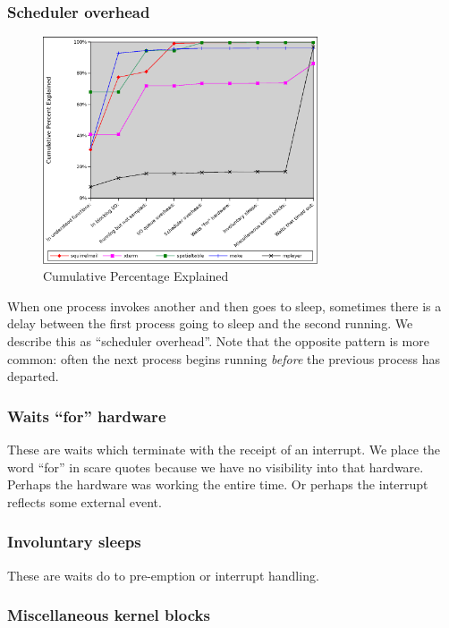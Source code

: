 \documentclass[10pt]{article}
\begin{document}
\subsubsection{Scheduler overhead}
\begin{figure}[b!]
\includegraphics[width=3.2in]{images/5cumugraph}
\caption{Cumulative Percentage Explained}
\label{fig:resgraph}
\end{figure}

When one process invokes another and then goes to sleep, sometimes there is a delay between the first process going to sleep and the second running.  We describe this as ``scheduler overhead''.  Note that the opposite pattern is more common: often the next process begins running \emph{before} the previous process has departed.

\subsubsection{Waits ``for'' hardware}

These are waits which terminate with the receipt of an interrupt.  We place the word ``for'' in scare quotes because we have no visibility into that hardware.  Perhaps the hardware was working the entire time.  Or perhaps the interrupt reflects some external event.

\subsubsection{Involuntary sleeps}

These are waits do to pre-emption or interrupt handling.

\subsubsection{Miscellaneous kernel blocks}
\end{document}
